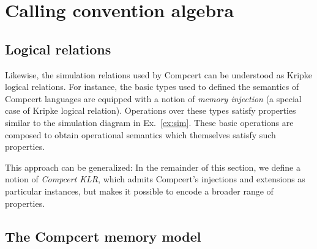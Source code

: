 \section{Calling convention algebra}


\subsection{Logical relations} %

Likewise,
the simulation relations used by Compcert can be understood
as Kripke logical relations.
For instance,
the basic types used to defined the semantics of Compcert languages
are equipped with a notion of \emph{memory injection}
(a special case of Kripke logical relation).
Operations over these types
satisfy properties similar to the simulation diagram in Ex.~\ref{ex:sim}.
These basic operations are composed
to obtain operational semantics
which themselves
satisfy such properties.

This approach can be generalized:
In the remainder of this section,
we define a notion of \emph{Compcert KLR},
which admits Compcert's injections and extensions
as particular instances,
but makes it possible to encode
a broader range of properties.


\subsection{The Compcert memory model} %

